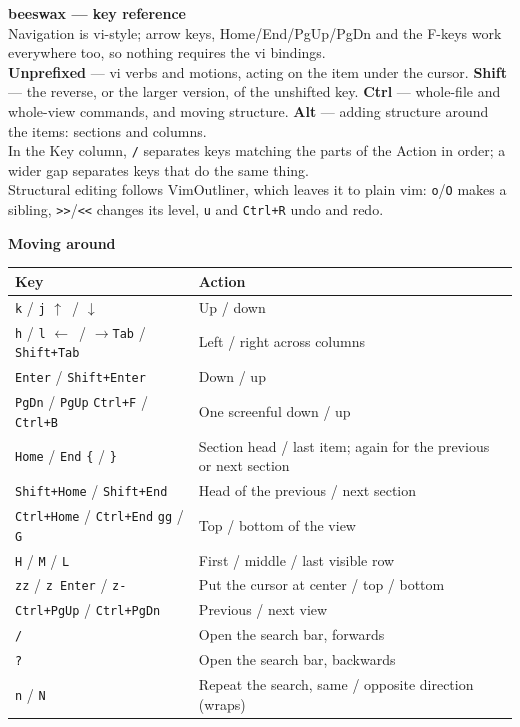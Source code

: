 \documentclass[10pt]{article}
\newcommand{\key}[1]{\texttt{#1}}
\newcommand{\up}{$\uparrow$}
\newcommand{\dn}{$\downarrow$}
\newcommand{\lft}{$\leftarrow$}
\newcommand{\rgt}{$\rightarrow$}
\newcommand{\sep}{\hspace{0.7em}}
\newcommand{\heading}[1]{\par\vspace{5pt}\textbf{#1}\par\vspace{3pt}}
\newenvironment{keytable}[1]
  {\begin{tabular}{|>{\raggedright\arraybackslash}p{5.4cm}|>{\raggedright\arraybackslash}p{#1}|}\hline
   \textbf{Key} & \textbf{Action}\\\hline\hline}
  {\end{tabular}}
\begin{document}
\footnotesize

{\large\textbf{beeswax --- key reference}}\\[3pt]
Navigation is vi-style; arrow keys, Home/End/PgUp/PgDn and the F-keys work
everywhere too, so nothing requires the vi bindings.\\[3pt]
\textbf{Unprefixed} --- vi verbs and motions, acting on the item under the cursor.
\textbf{Shift} --- the reverse, or the larger version, of the unshifted key.
\textbf{Ctrl} --- whole-file and whole-view commands, and moving structure.
\textbf{Alt} --- adding structure around the items: sections and columns.\\[3pt]
In the Key column, \key{/} separates keys matching the parts of the Action in
order; a wider gap separates keys that do the same thing.\\[3pt]
Structural editing follows VimOutliner, which leaves it to plain vim:
\key{o}/\key{O} makes a sibling, \key{>{}>}/\key{<{}<} changes its level, \key{u}
and \key{Ctrl+R} undo and redo.

\heading{Moving around}
\begin{keytable}{12.6cm}
\key{k} / \key{j} \sep \up\ / \dn & Up / down\\\hline
\key{h} / \key{l} \sep \lft\ / \rgt \sep \key{Tab} / \key{Shift+Tab} & Left / right across columns\\\hline
\key{Enter} / \key{Shift+Enter} & Down / up\\\hline
\key{PgDn} / \key{PgUp} \sep \key{Ctrl+F} / \key{Ctrl+B} & One screenful down / up\\\hline
\key{Home} / \key{End} \sep \key{\{} / \key{\}} & Section head / last item; again for the previous or next section\\\hline
\key{Shift+Home} / \key{Shift+End} & Head of the previous / next section\\\hline
\key{Ctrl+Home} / \key{Ctrl+End} \sep \key{gg} / \key{G} & Top / bottom of the view\\\hline
\key{H} / \key{M} / \key{L} & First / middle / last visible row\\\hline
\key{zz} / \key{z Enter} / \key{z-} & Put the cursor at center / top / bottom\\\hline
\key{Ctrl+PgUp} / \key{Ctrl+PgDn} & Previous / next view\\\hline
\key{/} & Open the search bar, forwards\\\hline
\key{?} & Open the search bar, backwards\\\hline
\key{n} / \key{N} & Repeat the search, same / opposite direction (wraps)\\\hline
\end{keytable}
\end{document}
